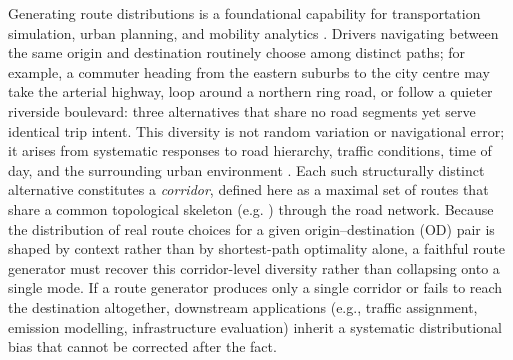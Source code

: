 %


Generating route distributions is a foundational capability for transportation simulation, urban planning, and mobility analytics \citep{rong2025odsurvey,moro2021mobility,nilforoshan2023mobility}.
Drivers navigating between the same origin and destination routinely choose among distinct paths; for example, a commuter heading from the eastern suburbs to the city centre may take the arterial highway, loop around a northern ring road, or follow a quieter riverside boulevard: three alternatives that share no road segments yet serve identical trip intent.
This diversity is not random variation or navigational error; it arises from systematic responses to road hierarchy, traffic conditions, time of day, and the surrounding urban environment \citep{gonzalez2008mobility}. 
Each such structurally distinct alternative constitutes a \emph{corridor}, defined here as a maximal set of routes that share a common topological skeleton (e.g. ) through the road network.
Because the distribution of real route choices for a given origin--destination (OD) pair is shaped by context rather than by shortest-path optimality alone, a faithful route generator must recover this corridor-level diversity rather than collapsing onto a single mode.
If a route generator produces only a single corridor or fails to reach the destination altogether, downstream applications (e.g., traffic assignment, emission modelling, infrastructure evaluation) inherit a systematic distributional bias that cannot be corrected after the fact.

